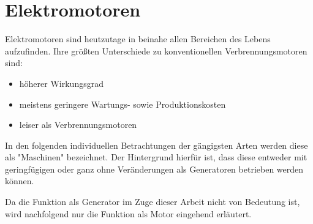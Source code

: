 \chapter{Elektromotoren}

Elektromotoren sind heutzutage in beinahe allen Bereichen des Lebens aufzufinden. 
Ihre größten Unterschiede zu konventionellen Verbrennungsmotoren sind:
\begin{itemize}
    \item höherer Wirkungsgrad
    \item meistens geringere Wartungs- sowie Produktionskosten
    \item leiser als Verbrennungsmotoren
\end{itemize}

In den folgenden individuellen Betrachtungen der gängigsten Arten werden diese als "Maschinen" bezeichnet.
Der Hintergrund hierfür ist, dass diese entweder mit geringfügigen oder ganz ohne Veränderungen als Generatoren betrieben werden können.

Da die Funktion als Generator im Zuge dieser Arbeit nicht von Bedeutung ist, wird nachfolgend nur die Funktion als Motor eingehend erläutert.
